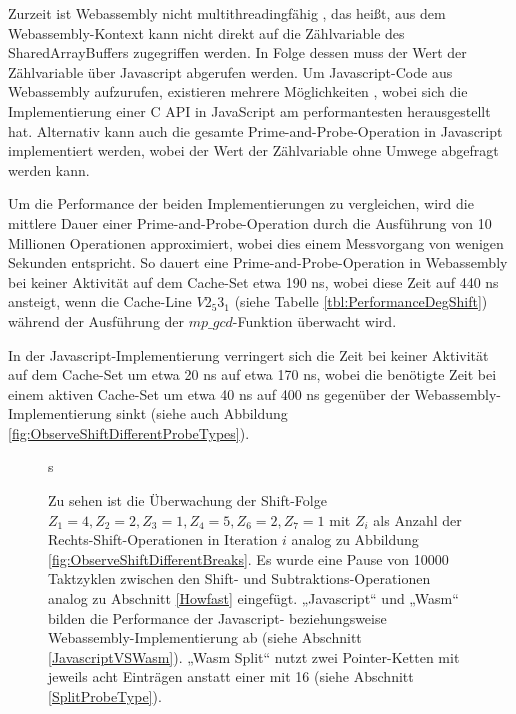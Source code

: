 Zurzeit ist Webassembly nicht multithreadingfähig \cite{WebassemblyThreads}, das heißt, aus dem Webassembly-Kontext kann nicht direkt auf die Zählvariable des SharedArrayBuffers zugegriffen werden.
In Folge dessen muss der Wert der Zählvariable über Javascript abgerufen werden.
Um Javascript-Code aus Webassembly aufzurufen, existieren mehrere Möglichkeiten \cite{CallJavaScriptFromWasm}, wobei sich die Implementierung einer C API in JavaScript am performantesten herausgestellt hat.
Alternativ kann auch die gesamte Prime-and-Probe-Operation in Javascript implementiert werden, wobei der Wert der Zählvariable ohne Umwege abgefragt werden kann.

Um die Performance der beiden Implementierungen zu vergleichen, wird die mittlere Dauer einer Prime-and-Probe-Operation durch die Ausführung von 10 Millionen Operationen approximiert, wobei dies einem Messvorgang von wenigen Sekunden entspricht.
So dauert eine Prime-and-Probe-Operation in Webassembly bei keiner Aktivität auf dem Cache-Set etwa 190 ns, wobei diese Zeit auf 440 ns ansteigt, wenn die Cache-Line $V2_5 3_1$ (siehe Tabelle \ref{tbl:PerformanceDegShift}) während der Ausführung der $mp\_gcd$-Funktion überwacht wird.

In der Javascript-Implementierung verringert sich die Zeit bei keiner Aktivität auf dem Cache-Set um etwa 20 ns auf etwa 170 ns, wobei die benötigte Zeit bei einem aktiven Cache-Set um etwa 40 ns auf 400 ns gegenüber der Webassembly-Implementierung sinkt (siehe auch Abbildung \ref{fig:ObserveShiftDifferentProbeTypes}).

\label{fig:ObserveShiftDifferentProbeTypes}
\begin{figure}[h]s
\centering
\begin{scaletikzpicturetowidth}{\textwidth}

\end{scaletikzpicturetowidth}
\caption{Zu sehen ist die Überwachung der Shift-Folge $Z_1=4,Z_2=2,Z_3=1,Z_4=5,Z_6=2,Z_7=1$ mit $Z_i$ als Anzahl der Rechts-Shift-Operationen in Iteration $i$ analog zu Abbildung \ref{fig:ObserveShiftDifferentBreaks}. Es wurde eine Pause von 10000 Taktzyklen zwischen den Shift- und Subtraktions-Operationen analog zu Abschnitt \ref{Howfast} eingefügt. „Javascript“ und „Wasm“ bilden die Performance der Javascript- beziehungsweise Webassembly-Implementierung ab (siehe Abschnitt \ref{JavascriptVSWasm}). „Wasm Split“ nutzt zwei Pointer-Ketten mit jeweils acht Einträgen anstatt einer mit 16 (siehe Abschnitt \ref{SplitProbeType}).%
}
\end{figure}

